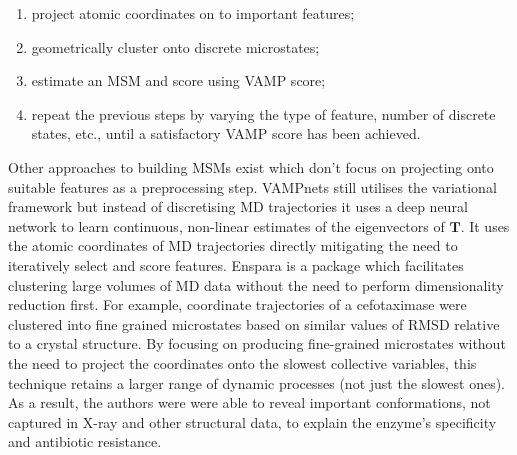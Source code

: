 \begin{enumerate}
    \item project atomic coordinates on to important features;
    \item geometrically cluster onto discrete microstates;
    \item estimate an MSM and score using VAMP score;
    \item repeat the previous steps by varying the type of feature, number of discrete states, etc., until a satisfactory VAMP score has been achieved.   
\end{enumerate}

Other approaches to building MSMs exist which don't focus on  projecting onto suitable features as a preprocessing step. VAMPnets \cite{mardtVAMPnetsDeepLearning2018} still utilises the variational framework but instead of discretising MD trajectories it uses a deep neural network to learn continuous, non-linear estimates of the eigenvectors of $\mathbf{T}$. It uses the atomic coordinates of MD trajectories directly mitigating the need to iteratively select and score features.  Enspara \cite{porterEnsparaModelingMolecular2019} is a package which facilitates clustering large volumes of MD data without the need to perform dimensionality reduction first. For example, coordinate trajectories of a cefotaximase \cite{hartModellingProteinsHidden2016} were clustered into fine grained microstates based on similar values of RMSD relative to a crystal structure.  By focusing on producing fine-grained microstates without the need to project the coordinates onto the slowest collective variables, this technique retains a larger range of dynamic processes (not just the slowest ones). As a result, the authors were were able to reveal important conformations, not captured in X-ray and other structural data, to explain the enzyme's specificity and antibiotic resistance.  

